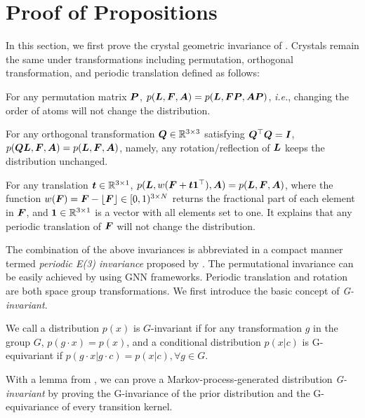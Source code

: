 \section{Proof of Propositions}\label{appd:geometric_invar}
In this section, we first prove the crystal geometric invariance of \modelname. Crystals remain the same under transformations including permutation, orthogonal transformation, and periodic translation defined as follows:
\begin{definition} 
\label{De:pi}
For any permutation matrix ${\bm{P}}$, $p({\bm{L}},{\bm{F}},{\bm{A}})=p({\bm{L}},{\bm{F}}{\bm{P}}, {\bm{A}}{\bm{P}})$, \emph{i.e.}, changing the order of atoms will not change the distribution.  
\end{definition}
\begin{definition} 
\label{De:oi}
For any orthogonal transformation ${\bm{Q}}\in\mathbb{R}^{3\times 3}$ satisfying ${\bm{Q}}^\top{\bm{Q}}={\bm{I}}$, $p({\bm{Q}}{\bm{L}},{\bm{F}},{\bm{A}})=p({\bm{L}},{\bm{F}},{\bm{A}})$, namely, any rotation/reflection of ${\bm{L}}$ keeps the distribution unchanged.   
\end{definition}
\begin{definition} 
\label{De:PTI}
For any translation ${\bm{t}}\in\mathbb{R}^{3\times1}$, $p({\bm{L}}, w({\bm{F}} + {\bm{t}}{\bm{1}}^\top),{\bm{A}})=p({\bm{L}}, {\bm{F}} ,{\bm{A}})$, where the function $w({\bm{F}})={\bm{F}} - \lfloor{\bm{F}}\rfloor \in [0,1)^{3\times N}$ returns the fractional part of each element in ${\bm{F}}$, and ${\bm{1}}\in\mathbb{R}^{3\times1}$ is a vector with all elements set to one. It explains that any periodic translation of ${\bm{F}}$ will not change the distribution.  
\end{definition}
The combination of the above invariances is abbreviated in a compact manner termed \textit{periodic E(3) invariance} proposed by \citet{jiao2023crystal}. The permutational invariance can be easily achieved by using GNN frameworks. Periodic translation and rotation are both space group transformations. We first introduce the basic concept of \emph{G-invariant}.
\begin{definition}
\label{def:ei}
We call a distribution $p(x)$ is $G$-invariant if for any transformation $g$ in the group $G$, $p(g\cdot x) = p(x)$, and a conditional distribution $p(x|c)$ is G-equivariant if $p(g\cdot x|g\cdot c) = p(x|c), \forall g\in G$.
\end{definition}
With a lemma from \citet{xu2021geodiff}, we can prove a Markov-process-generated distribution \emph{G-invariant} by proving the G-invariance of the prior distribution and the G-equivariance of every transition kernel.
